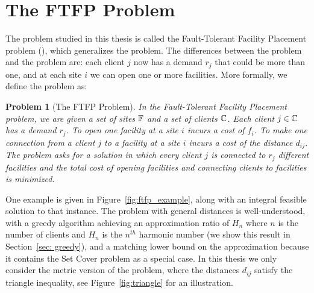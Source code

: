 \documentclass[oneside,final]{ucr}
\newtheorem{problem}[theorem]{Problem}
\def\ssp{\def\baselinestretch{1.0}\large\normalsize}
\begin{document}
\section{The FTFP Problem}
The problem studied in this thesis is called the
Fault-Tolerant Facility Placement problem (\FTFP), which
generalizes the {\UFL} problem. The differences between the
{\UFL} problem and the {\FTFP} problem are: each client $j$
now has a demand $r_j$ that could be more than one, and at
each site $i$ we can open one or more facilities. More
formally, we define the {\FTFP} problem as:
\begin{problem}[The FTFP Problem]
  \label{problem:ftfp}
  In the Fault-Tolerant Facility Placement problem, we are
  given a set of sites $\mathbb{F}$ and a set of clients
  $\mathbb{C}$. Each client $j \in \mathbb{C}$ has a demand
  $r_j$. To open one facility at a site $i$ incurs a cost of
  $f_i$. To make one connection from a client $j$ to a
  facility at a site $i$ incurs a cost of the distance
  $d_{ij}$. The problem asks for a solution in which every
  client $j$ is connected to $r_j$ different facilities and
  the total cost of opening facilities and connecting
  clients to facilities is minimized.
\end{problem}
One example is given in Figure~\ref{fig:ftfp_example}, along
with an integral feasible solution to that instance. The
{\FTFP} problem with general distances is well-understood,
with a greedy algorithm achieving an approximation ratio of
$H_n$ where $n$ is the number of clients and $H_n$ is the
$n^{th}$ harmonic number (we show this result in
Section~\ref{sec: greedy}), and a matching lower bound on
the approximation because it contains the Set Cover problem
as a special case. In this thesis we only consider the
metric version of the {\FTFP} problem, where the distances
$d_{ij}$ satisfy the triangle inequality, see
Figure~\ref{fig:triangle} for an illustration.
\ssp
\end{document}
